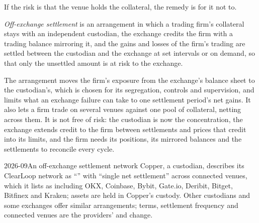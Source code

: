 If the risk is that the venue holds the collateral, the remedy is for it not to.

\begin{definition}\label{def:m3:centralised-exchanges:oes}
\emph{Off-exchange settlement} is an arrangement in which a trading firm's
collateral stays with an independent custodian, the exchange credits the firm with a trading balance
mirroring it, and the gains and losses of the firm's trading are settled between the custodian and the
exchange at set intervals or on demand, so that only the unsettled amount is at risk to the exchange.
\end{definition}

The arrangement moves the firm's exposure from the exchange's balance sheet to the custodian's, which is
chosen for its segregation, controls and supervision, and limits what an exchange failure can take to one
settlement period's net gains. It also lets a firm trade on several venues against one pool of collateral,
netting across them. It is not free of risk: the custodian is now the concentration, the exchange extends
credit to the firm between settlements and prices that credit into its limits, and the firm needs its
positions, its mirrored balances and the settlements to reconcile every cycle.

\begin{dated}{2026-09}{An off-exchange settlement network}\label{dat:m3:centralised-exchanges:clearloop}
Copper, a custodian, describes its ClearLoop network as ``'' with ``single net
settlement'' across connected venues, which it lists as including OKX, Coinbase, Bybit, Gate.io, Deribit,
Bitget, Bitfinex and Kraken; assets are held in Copper's custody. Other custodians and some exchanges offer
similar arrangements; terms, settlement frequency and connected venues are the providers' and change.
\end{dated}

